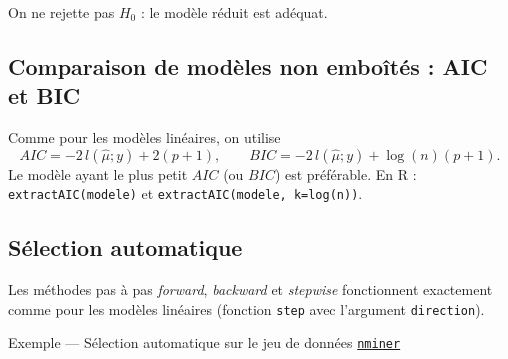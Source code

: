 \documentclass[
  french,
  letterpaper,
  DIV=11,
  numbers=noendperiod]{scrreprt}
\newenvironment{Shaded}{\begin{snugshade}}{\end{snugshade}}
\newcommand{\AttributeTok}[1]{\textcolor[rgb]{0.40,0.45,0.13}{#1}}
\newcommand{\CommentTok}[1]{\textcolor[rgb]{0.37,0.37,0.37}{#1}}
\newcommand{\DecValTok}[1]{\textcolor[rgb]{0.68,0.00,0.00}{#1}}
\newcommand{\FunctionTok}[1]{\textcolor[rgb]{0.28,0.35,0.67}{#1}}
\newcommand{\NormalTok}[1]{\textcolor[rgb]{0.00,0.23,0.31}{#1}}
\newcommand{\OtherTok}[1]{\textcolor[rgb]{0.00,0.23,0.31}{#1}}
\newcommand{\SpecialCharTok}[1]{\textcolor[rgb]{0.37,0.37,0.37}{#1}}
\begin{document}
On ne rejette pas \(H_0\) : le modèle réduit est adéquat.

\subsection{Comparaison de modèles non emboîtés : AIC et
BIC}\label{comparaison-de-moduxe8les-non-embouxeetuxe9s-aic-et-bic}

Comme pour les modèles linéaires, on utilise
\[AIC = -2\,l(\hat\mu;y) + 2(p+1), \qquad BIC = -2\,l(\hat\mu;y) + \log(n)(p+1).\]
Le modèle ayant le plus petit \(AIC\) (ou \(BIC\)) est préférable. En R
: \texttt{extractAIC(modele)} et \texttt{extractAIC(modele,\ k=log(n))}.

\subsection{Sélection automatique}\label{suxe9lection-automatique}

Les méthodes pas à pas \emph{forward}, \emph{backward} et
\emph{stepwise} fonctionnent exactement comme pour les modèles linéaires
(fonction \texttt{step} avec l'argument \texttt{direction}).

{Exemple --- Sélection automatique sur le jeu de données
\hyperref[data-nminer]{\texttt{nminer}}}

\begin{Shaded}
\end{Shaded}
\end{document}
